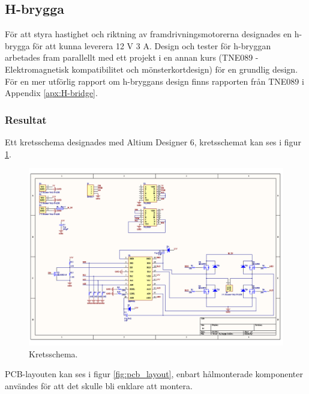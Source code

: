 \subsection{H-brygga}
För att styra hastighet och riktning av framdrivningsmotorerna designades en
h-brygga för att kunna leverera 12 V 3 A. Design och tester för h-bryggan
arbetades fram parallellt med ett projekt i en annan kurs (TNE089 -
Elektromagnetisk kompatibilitet och mönsterkortdesign) för en grundlig design.
För en mer utförlig rapport om h-bryggans design finns rapporten från TNE089 i
Appendix \ref{apx:H-bridge}.

\subsubsection{Resultat}
Ett kretsschema designades med Altium Designer 6, kretsschemat kan ses i figur \ref{fig:h_brygga_schema}.

\begin{landscape}
\begin{figure}[htbp!]
\centering
\includegraphics[width=20cm]{../../includes/figures/h_brygga_schematic}
\caption{Kretsschema.}
\label{fig:h_brygga_schema}
\end{figure}
\end{landscape}

PCB-layouten kan ses i figur \ref{fig:pcb_layout}, enbart hålmonterade komponenter användes för att det skulle bli enklare att montera.

